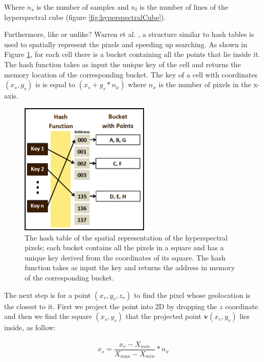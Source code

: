 \documentclass{subfiles}
\begin{document}
	\par Where $n_s$ is the number of samples and $n_l$ is the number of lines of the hyperspectral cube (figure \ref{fig:hyperspectralCube}).
	
	\par {\color{blue}Furthermore, {\color{pink}like or unlike?} Warren et al. \cite{Warren2014}, a structure similar to hash tables is used to spatially represent the pixels and speeding up searching. As shown in Figure \ref{fig:HashTable}, for each cell there is a bucket containing all the points that lie inside it. The hash function takes as input the unique key of the cell and returns the memory location of the corresponding bucket. The key of a cell with coordinates $(x_s,y_s)$ is is equal to $(x_s + y_s *n_x)$ where $n_x$ is the number of pixels in the x-axis.}
	
	 \begin{figure} [h!]
	 	\centering
	 	\includegraphics[width=0.55\textwidth]{img/HashTable}
	 	\caption[Hash Table]{The hash table of the spatial representation of the hyperspectral pixels; each bucket contains all the pixels in a square and has a unique key derived from the coordinates of its square. The hash function takes as input the key and returns the address in memory of the corresponding bucket. }
	 	\label{fig:HashTable}
	 \end{figure}
	
	\par The next step is for a point $(x_v, y_v, z_v)$ to find the pixel whose geolocation is the closest to it. First we project the point into 2D by dropping the $z$ coordinate and then we find the square $(x_s , y_s )$ that the projected point $\mathbf{v}(x_v , y_v)$ lies inside, as follow: 
	
    \begin{eqnarray}
	    x_s = \dfrac{x_v-X_{min}}{X_{max}-X_{min}} * n_x
    \end{eqnarray}
	
\end{document}
